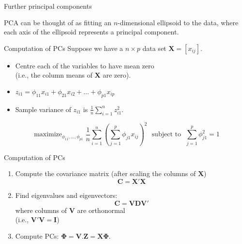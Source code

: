 \documentclass[14pt]{beamer}
\begin{document}



\begin{frame}{Further principal components}
\pause\vspace*{5.5cm}

\begin{block}{}
PCA can be thought of as fitting an $n$-dimensional ellipsoid to the data, where each axis of the ellipsoid represents a principal component.
\end{block}
\end{frame}

\begin{frame}{Computation of PCs}
Suppose we have a $n\times p$ data set $\bm{X} = [x_{ij}]$. 
\begin{itemize}
\item Centre each of the variables to have mean zero\\ (i.e., the
column means of $\bm{X}$ are zero).
\item  $z_{i1} = \phi_{11}x_{i1} + \phi_{21} x_{i2} + \dots + \phi_{p1} x_{ip}$
\item Sample variance of $z_{i1}$ is $\displaystyle\frac1n\sum_{i=1}^n z_{i1}^2$.
\end{itemize}\pause
\begin{block}{}\vspace*{-0.5cm}
\[
\mathop{\text{maximize}}_{\phi_{11},\dots,\phi_{p1}} \frac{1}{n}\sum_{i=1}^n 
\left(\sum_{j=1}^p \phi_{j1}x_{ij}\right)^2 \text{~~subject to~~}
\sum_{j=1}^p \phi^2_{j1} = 1
\]
\end{block}


\end{frame}

\begin{frame}{Computation of PCs}

\begin{enumerate}
\item Compute the covariance matrix (after scaling the columns of $\bm{X}$)
$$\bm{C} = \bm{X}'\bm{X}$$

\item Find eigenvalues and eigenvectors:
$$\bm{C}=\bm{V}\bm{D}\bm{V}'$$ 
where columns of $\bm{V}$ are orthonormal\\ (i.e., $\bm{V}'\bm{V}=\bm{I}$)

\item Compute PCs: $\bm{\Phi} = \bm{V}$.\quad $\bm{Z} = \bm{X}\bm{\Phi}$.

\end{enumerate}
\end{frame}
\end{document}
